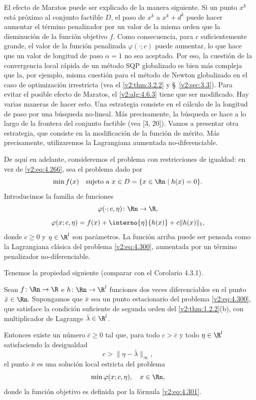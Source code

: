 El efecto de Maratos puede ser explicado de la manera siguiente. Si un punto $x^k$ está próximo al conjunto factible $D$, el paso de $x^k$ a $x^k + d^k$ puede hacer aumentar el término penalizador por un valor de la misma orden que la disminución de la función objetivo $f$. Como consecuencia, para $c$ suficientemente grande, el valor de la función penalizada $\varphi(\cdot; c)$ puede aumentar, lo que hace que un valor de longitud de paso $\alpha = 1$ no sea aceptado. Por eso, la cuestión de la convergencia local rápida de un método SQP globalizado es bien más compleja que la, por ejemplo, misma cuestión para el método de Newton globalizado en el caso de optimización irrestricta (vea el \cref{v2:thm:3.2.2} y \S~\ref{v2:sec:3.3}). Para evitar el posible efecto de Maratos, el \cref{v2:alg:4.6.3} tiene que ser modificado. Hay varias maneras de hacer esto. Una estrategia consiste en el cálculo de la longitud de paso por una búsqueda no-lineal. Más precisamente, la búsqueda se hace a lo largo de la frontera del conjunto factible (vea [3, 20]). Vamos a presentar otra estrategia, que consiste en la modificación de la función de mérito. Más precisamente, utilizaremos la Lagrangiana aumentada no-diferenciable.

De aquí en adelante, consideremos el problema con restricciones de igualdad: en vez de \eqref{v2:eq:4.266}, sea el problema dado por
\begin{equation}
\min f(x) \quad \text{sujeto a } x \in D = \{ x \in \Rn \mid h(x) = 0 \}.
\label{v2:eq:4.300}
\end{equation}
Introducimos la familia de funciones
\[
\varphi(\cdot; c, \eta) \colon \Rn \to \R,
\]
\begin{equation}
\varphi(x; c, \eta) = f(x) + \interno{\eta}{h(x)} + c \|h(x)\|_1,
\label{v2:eq:4.301}
\end{equation}
donde $c \ge 0$ y $\eta \in \R^l$ son parámetros. La función arriba puede ser pensada como la Lagrangiana clásica del problema \eqref{v2:eq:4.300}, aumentada por un término penalizador no-diferenciable.

Tenemos la propiedad siguiente (comparar con el Corolario 4.3.1).

\begin{proposition}\label{v2:prop:4.6.1}
Sean $f \colon \Rn \to \R$ e $h \colon \Rn \to \R^l$ funciones dos veces diferenciables en el punto $\bar{x} \in \Rn$. Supongamos que $\bar{x}$ sea un punto estacionario del problema \eqref{v2:eq:4.300}, que satisface la condición suficiente de segunda orden del \cref{v2:thm:1.2.2}(b), con multiplicador de Lagrange $\bar{\lambda} \in \R^l$.

Entonces existe un número $\bar{c} \ge 0$ tal que, para todo $c > \bar{c}$ y todo $\eta \in \R^l$ satisfaciendo la desigualdad
\begin{equation}
c > \|\eta - \bar{\lambda}\|_\infty,
\label{v2:eq:4.302}
\end{equation}
el punto $\bar{x}$ es una solución local estricta del problema
\[
\min \varphi(x; c, \eta), \quad x \in \Rn,
\]
donde la función objetivo es definida por la fórmula \eqref{v2:eq:4.301}.
\end{proposition}

